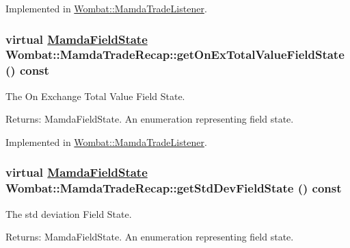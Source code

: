Implemented in \hyperlink{classWombat_1_1MamdaTradeListener_a47baf1358d91fa1b44bcf2f326f74ca}{Wombat::Mamda\-Trade\-Listener}.\hypertarget{classWombat_1_1MamdaTradeRecap_bd3a92c7aa26621a03cd80ef45f37f12}{
\subsubsection[getOnExTotalValueFieldState]{\setlength{\rightskip}{0pt plus 5cm}virtual \hyperlink{namespaceWombat_93aac974f2ab713554fd12a1fa3b7d2a}{Mamda\-Field\-State} Wombat::Mamda\-Trade\-Recap::get\-On\-Ex\-Total\-Value\-Field\-State () const}}
\label{classWombat_1_1MamdaTradeRecap_bd3a92c7aa26621a03cd80ef45f37f12}


The On Exchange Total Value Field State. 

\begin{Desc}
\item[Returns:]Mamda\-Field\-State. An enumeration representing field state. \end{Desc}


Implemented in \hyperlink{classWombat_1_1MamdaTradeListener_63ff116bb1922942926fedde13e4c2f4}{Wombat::Mamda\-Trade\-Listener}.\hypertarget{classWombat_1_1MamdaTradeRecap_0555b4b9265d2aecd14660dacd6e8bf3}{
\subsubsection[getStdDevFieldState]{\setlength{\rightskip}{0pt plus 5cm}virtual \hyperlink{namespaceWombat_93aac974f2ab713554fd12a1fa3b7d2a}{Mamda\-Field\-State} Wombat::Mamda\-Trade\-Recap::get\-Std\-Dev\-Field\-State () const}}
\label{classWombat_1_1MamdaTradeRecap_0555b4b9265d2aecd14660dacd6e8bf3}


The std deviation Field State. 

\begin{Desc}
\item[Returns:]Mamda\-Field\-State. An enumeration representing field state. \end{Desc}


